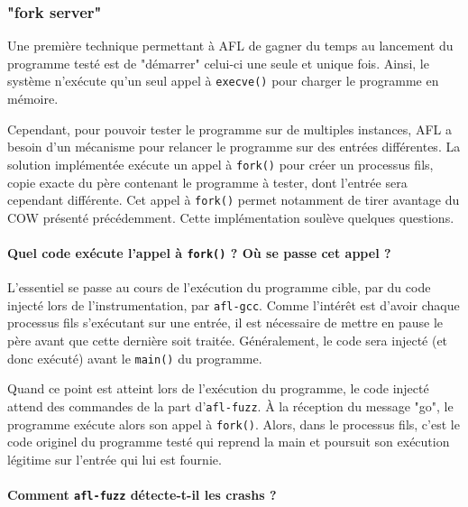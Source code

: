 \subsubsection{"fork server"}
Une première technique permettant à AFL de gagner du temps au lancement du programme testé est de "démarrer" celui-ci une seule et unique fois.
Ainsi, le système n'exécute qu'un seul appel à \lstinline{execve()} pour charger le programme en mémoire.

Cependant, pour pouvoir tester le programme sur de multiples instances, AFL a besoin d'un mécanisme pour relancer le programme sur des entrées différentes.
La solution implémentée exécute un appel à \lstinline{fork()} pour créer un processus fils, copie exacte du père contenant le programme à tester, dont l'entrée sera cependant différente.
Cet appel à \lstinline{fork()} permet notamment de tirer avantage du COW présenté précédemment.
Cette implémentation soulève quelques questions.

\paragraph{Quel code exécute l'appel à \lstinline{fork()} ? Où se passe cet appel ?}

L'essentiel se passe au cours de l'exécution du programme cible, par du code injecté lors de l'instrumentation, par \lstinline{afl-gcc}.
Comme l'intérêt est d'avoir chaque processus fils s'exécutant sur une entrée, il est nécessaire de mettre en pause le père avant que cette dernière soit traitée.
Généralement, le code sera injecté (et donc exécuté) avant le \lstinline{main()} du programme.

Quand ce point est atteint lors de l'exécution du programme, le code injecté attend des commandes de la part d'\lstinline{afl-fuzz}.
À la réception du message "go", le programme exécute alors son appel à \lstinline{fork()}.
Alors, dans le processus fils, c'est le code originel du programme testé qui reprend la main et poursuit son exécution légitime sur l'entrée qui lui est fournie.


\paragraph{Comment \lstinline{afl-fuzz} détecte-t-il les crashs ?}

